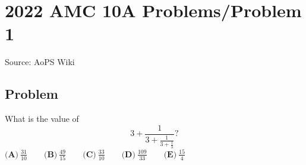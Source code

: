 \documentclass[12pt]{article}
\begin{document}
\section*{{2022 AMC 10A Problems/Problem 1}}
Source: AoPS Wiki

\subsection*{Problem}
What is the value of \[3+\frac{1}{3+\frac{1}{3+\frac13}}?\] $\textbf{(A)}\ \frac{31}{10}\qquad\textbf{(B)}\ \frac{49}{15}\qquad\textbf{(C)}\ \frac{33}{10}\qquad\textbf{(D)}\ \frac{109}{33}\qquad\textbf{(E)}\ \frac{15}{4}$
\end{document}
